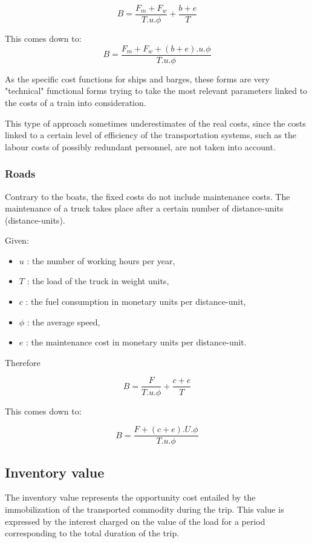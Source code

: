 $$B=\frac{F_m+F_w}{T.u.\phi} + \frac{b+e}{T}$$

This comes down to:
$$B=\frac{F_m+F_w+(b+e).u.\phi}{T.u.\phi}$$


As the specific cost functions for ships and barges, these forms are very
"technical" functional forms trying to take the most relevant parameters linked
to the costs of a train into consideration.

This type of approach sometimes
underestimates of the real costs, since the costs linked to a certain level of
efficiency of the transportation systems, such as the labour costs of possibly
redundant personnel, are not taken into account.



\subsubsection{Roads}

Contrary to the boats, the fixed costs do not include maintenance costs.  The
maintenance of a truck takes place after a certain number of distance-units (distance-units).


Given:

\begin{itemize}
\item $u$ : the number of working hours per year,
\item $T$ : the load of the truck in weight units,
\item $c$ : the fuel consumption in monetary units per distance-unit,
\item $\phi$ : the average speed,
\item $e$ : the maintenance cost in monetary units per distance-unit.
\end{itemize}


Therefore

$$B=\frac{F}{T.u.\phi}+\frac{c+e}{T}$$

This comes down to:

$$B=\frac{F+(c+e).U.\phi}{T.u.\phi}$$



\subsection{Inventory value}

The inventory value represents the opportunity cost entailed by the
immobilization of the transported commodity during the trip.  This value is
expressed by the interest charged on the value of the load for a
period corresponding to the total duration of the trip.

